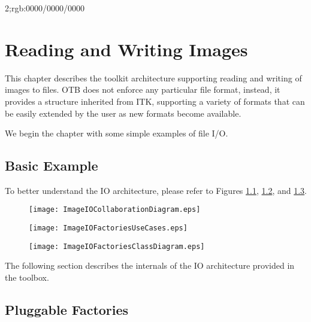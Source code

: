 2;rgb:0000/0000/0000\chapter{Reading and Writing Images}
\label{sec:IO}

This chapter describes the toolkit architecture supporting reading and
writing of images to files. OTB does not enforce any particular file
format, instead, it provides a structure inherited from ITK,
supporting a variety of formats that can be easily extended by the
user as new formats become available.

We begin the chapter with some simple examples of file I/O.

\section{Basic Example}
\label{sec:ImagReadWrite}


To better understand the IO architecture, please refer to Figures
\ref{fig:ImageIOCollaborationDiagram},
\ref{fig:ImageIOFactoriesUseCases}, and
\ref{fig:ImageIOFactoriesClassDiagram}.

\begin{figure}
\center
\texttt{[image: ImageIOCollaborationDiagram.eps]}
 \label{fig:ImageIOCollaborationDiagram}
\end{figure}

\begin{figure}
\center
\texttt{[image: ImageIOFactoriesUseCases.eps]}
\label{fig:ImageIOFactoriesUseCases}
\end{figure}

\begin{figure}
\center
\texttt{[image: ImageIOFactoriesClassDiagram.eps]}
\label{fig:ImageIOFactoriesClassDiagram}
\end{figure}


The following section describes the internals of the IO architecture provided
in the toolbox.

\section{Pluggable Factories}
\label{sec:ImageIOPluggableFactories}

